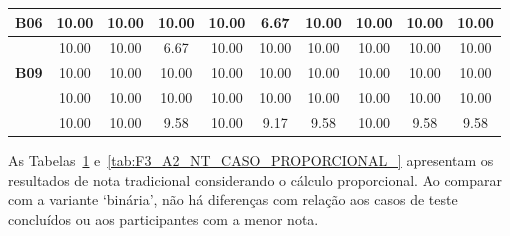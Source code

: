 \begin{table}[htbp]
\begin{tabular}{c|ccccccccc|}
		\multicolumn{1}{|c|}{\textbf{B06}} & \multicolumn{1}{c|}{10.00} & \multicolumn{1}{c|}{10.00} & \multicolumn{1}{c|}{10.00} & \multicolumn{1}{c|}{10.00} & \multicolumn{1}{c|}{6.67} & \multicolumn{1}{c|}{10.00} & \multicolumn{1}{c|}{10.00} & \multicolumn{1}{c|}{10.00} & 10.00 \\ \hline
		\rowcolor[HTML]{F2F2F2} 
		\multicolumn{1}{|c|}{\cellcolor[HTML]{F2F2F2}\textbf{B08}} & \multicolumn{1}{c|}{\cellcolor[HTML]{F2F2F2}10.00} & \multicolumn{1}{c|}{\cellcolor[HTML]{F2F2F2}10.00} & \multicolumn{1}{c|}{\cellcolor[HTML]{F2F2F2}6.67} & \multicolumn{1}{c|}{\cellcolor[HTML]{F2F2F2}10.00} & \multicolumn{1}{c|}{\cellcolor[HTML]{F2F2F2}10.00} & \multicolumn{1}{c|}{\cellcolor[HTML]{F2F2F2}10.00} & \multicolumn{1}{c|}{\cellcolor[HTML]{F2F2F2}10.00} & \multicolumn{1}{c|}{\cellcolor[HTML]{F2F2F2}10.00} & 10.00 \\ \hline
		\multicolumn{1}{|c|}{\textbf{B09}} & \multicolumn{1}{c|}{10.00} & \multicolumn{1}{c|}{10.00} & \multicolumn{1}{c|}{10.00} & \multicolumn{1}{c|}{10.00} & \multicolumn{1}{c|}{10.00} & \multicolumn{1}{c|}{10.00} & \multicolumn{1}{c|}{10.00} & \multicolumn{1}{c|}{10.00} & 10.00 \\ \hline
		\rowcolor[HTML]{F2F2F2} 
		\multicolumn{1}{|c|}{\cellcolor[HTML]{F2F2F2}\textbf{B10}} & \multicolumn{1}{c|}{\cellcolor[HTML]{F2F2F2}10.00} & \multicolumn{1}{c|}{\cellcolor[HTML]{F2F2F2}10.00} & \multicolumn{1}{c|}{\cellcolor[HTML]{F2F2F2}10.00} & \multicolumn{1}{c|}{\cellcolor[HTML]{F2F2F2}10.00} & \multicolumn{1}{c|}{\cellcolor[HTML]{F2F2F2}10.00} & \multicolumn{1}{c|}{\cellcolor[HTML]{F2F2F2}10.00} & \multicolumn{1}{c|}{\cellcolor[HTML]{F2F2F2}10.00} & \multicolumn{1}{c|}{\cellcolor[HTML]{F2F2F2}10.00} & 10.00 \\ \hline
		\rowcolor[HTML]{D0CECE} 
		\multicolumn{1}{|c|}{\cellcolor[HTML]{D0CECE}\textbf{Média}} & \multicolumn{1}{c|}{\cellcolor[HTML]{D0CECE}10.00} & \multicolumn{1}{c|}{\cellcolor[HTML]{D0CECE}10.00} & \multicolumn{1}{c|}{\cellcolor[HTML]{D0CECE}9.58} & \multicolumn{1}{c|}{\cellcolor[HTML]{D0CECE}10.00} & \multicolumn{1}{c|}{\cellcolor[HTML]{D0CECE}9.17} & \multicolumn{1}{c|}{\cellcolor[HTML]{D0CECE}9.58} & \multicolumn{1}{c|}{\cellcolor[HTML]{D0CECE}10.00} & \multicolumn{1}{c|}{\cellcolor[HTML]{D0CECE}9.58} & 9.58 \\ \hline
	\end{tabular}
	\label{tab:F3_A2_NT_CASO_PROPORCIONAL}
\end{table}

As Tabelas~\ref{tab:F3_A2_NT_CASO_PROPORCIONAL} e~\ref{tab:F3_A2_NT_CASO_PROPORCIONAL_} apresentam os resultados de nota tradicional considerando o cálculo proporcional. Ao comparar com a variante `binária', não há diferenças com relação aos casos de teste concluídos ou aos participantes com a menor nota.

